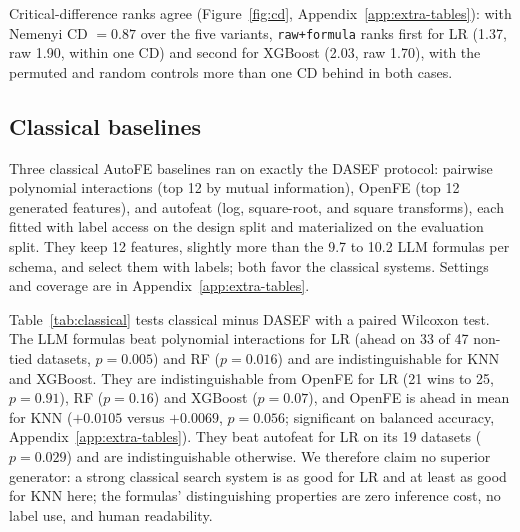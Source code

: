 Critical-difference ranks agree (Figure~\ref{fig:cd}, Appendix~\ref{app:extra-tables}): with Nemenyi CD \(= 0.87\) over the five variants, \texttt{raw+formula} ranks first for LR (1.37, raw 1.90, within one CD) and second for XGBoost (2.03, raw 1.70), with the permuted and random controls more than one CD behind in both cases.

\subsection{Classical baselines}\label{sec:classical}

Three classical AutoFE baselines ran on exactly the DASEF protocol: pairwise polynomial interactions (top 12 by mutual information), OpenFE (top 12 generated features), and autofeat (log, square-root, and square transforms), each fitted with label access on the design split and materialized on the evaluation split. They keep 12 features, slightly more than the 9.7 to 10.2 LLM formulas per schema, and select them with labels; both favor the classical systems. Settings and coverage are in Appendix~\ref{app:extra-tables}.

Table~\ref{tab:classical} tests classical minus DASEF with a paired Wilcoxon test. The LLM formulas beat polynomial interactions for LR (ahead on 33 of 47 non-tied datasets, \(p = 0.005\)) and RF (\(p = 0.016\)) and are indistinguishable for KNN and XGBoost. They are indistinguishable from OpenFE for LR (21 wins to 25, \(p = 0.91\)), RF (\(p = 0.16\)) and XGBoost (\(p = 0.07\)), and OpenFE is ahead in mean for KNN (\(+0.0105\) versus \(+0.0069\), \(p = 0.056\); significant on balanced accuracy, Appendix~\ref{app:extra-tables}). They beat autofeat for LR on its 19 datasets (\(p = 0.029\)) and are indistinguishable otherwise. We therefore claim no superior generator: a strong classical search system is as good for LR and at least as good for KNN here; the formulas' distinguishing properties are zero inference cost, no label use, and human readability.

